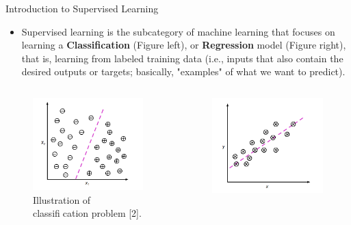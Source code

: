\documentclass[compress,oilve]{beamer}
\begin{document}
\begin{frame}{Introduction to Supervised Learning}
\begin{itemize}
\item Supervised learning is the subcategory of machine learning that focuses on learning a \textbf{Classification} (Figure left), or \textbf{Regression} model (Figure right), that is, learning from labeled training data (i.e., inputs that also contain the desired outputs or targets; basically, "examples" of what we want to predict).
\end{itemize}
\begin{columns}
\begin{column}{0.5\textwidth}
\begin{figure}
 \centering
 \includegraphics[scale=0.5]{10}  
 \caption{Illustration of classification problem [2].}
\end{figure}
\end{column}
\begin{column}{0.5\textwidth}
\begin{figure}
 \centering
 \includegraphics[scale=0.5]{11}  

\end{figure}
\end{column}
\end{columns}
\end{frame}
\end{document}
